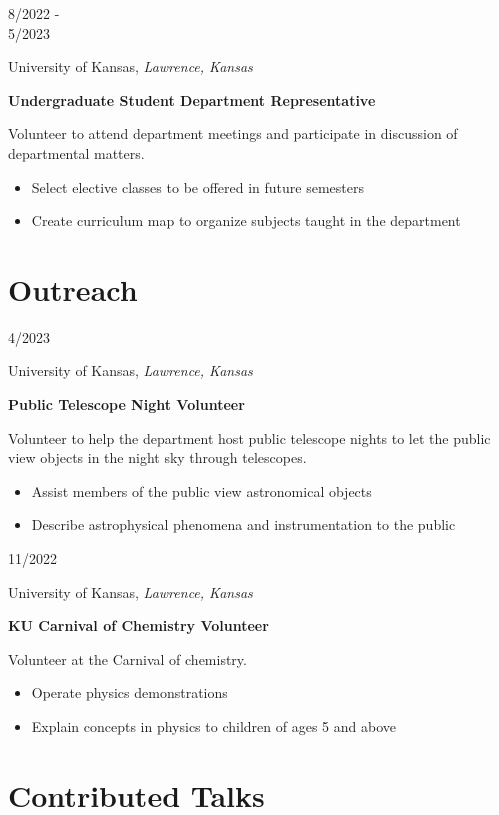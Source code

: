 \documentclass[12pt]{article}
\newenvironment{entry}[4]{
  \medskip
  \begin{minipage}[t]{0.75in}
    #3
  \end{minipage}
  \begin{minipage}[t]{\dimexpr\textwidth-0.75in}
    #1, \textit{#2}

    \textbf{#4}
    
    \smallskip
}{
  \end{minipage}
}
\begin{document}
\begin{entry}{University of Kansas}{Lawrence, Kansas}{8/2022 -\\ 5/2023}{Undergraduate Student Department Representative}
  Volunteer to attend department meetings and participate in discussion of
  departmental matters.
  \begin{itemize}
    \item Select elective classes to be offered in future semesters
    \item Create curriculum map to organize subjects taught in the department
  \end{itemize}  
\end{entry}

\section*{Outreach}\vspace{-1ex}

\begin{entry}{University of Kansas}{Lawrence, Kansas}{4/2023}{Public Telescope Night Volunteer}
  Volunteer to help the department host public telescope nights to let the
  public view objects in the night sky through telescopes.
  \begin{itemize}
    \item Assist members of the public view astronomical objects
    \item Describe astrophysical phenomena and instrumentation to the public
  \end{itemize}
\end{entry}

\begin{entry}{University of Kansas}{Lawrence, Kansas}{11/2022}{KU Carnival of Chemistry Volunteer}
  Volunteer at the Carnival of chemistry.
  \begin{itemize}
    \item Operate physics demonstrations
    \item Explain concepts in physics to children of ages 5 and above
  \end{itemize}
\end{entry}

\section*{Contributed Talks}\vspace{-1ex}

\newcommand{\talk}[4]{
  \medskip
  \begin{minipage}[t]{0.75in}
    #3
  \end{minipage}
  \begin{minipage}[t]{\dimexpr\textwidth-0.75in}
    \textbf{#1}, \textit{#2}\\
    #4
  \end{minipage}  
}
\end{document}
